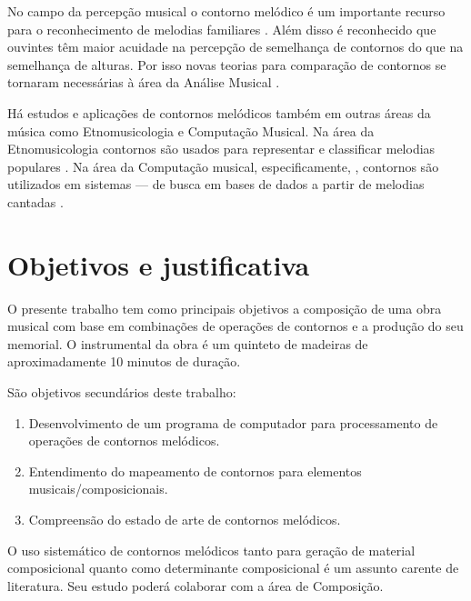 No campo da percepção musical o contorno melódico é um importante
recurso para o reconhecimento de melodias familiares \cite[p.
136]{dowling.ea86:music}. Além disso é reconhecido que ouvintes têm
maior acuidade na percepção de semelhança de contornos do que na
semelhança de alturas.
Por isso novas teorias para comparação de contornos se tornaram
necessárias à área da Análise Musical
\cite[p. 226]{marvin.ea87:relating}.

Há estudos e aplicações de contornos melódicos também em outras áreas
da música como Etnomusicologia e Computação Musical. Na área da
Etnomusicologia contornos são usados para representar e classificar
melodias populares \cite{adams76:melodic}. Na área da Computação
musical, especificamente, , contornos
são utilizados em sistemas  --- de busca em
bases de dados a partir de melodias cantadas \cite{ghias.ea95:query}.

\section{Objetivos e justificativa}
\label{sec:objet-e-just}

O presente trabalho tem como principais objetivos a composição de uma
obra musical com base em combinações de operações de contornos e a
produção do seu memorial. O instrumental da obra é um quinteto de
madeiras de aproximadamente 10 minutos de duração.

São objetivos secundários deste trabalho:

\begin{enumerate}
\item Desenvolvimento de um programa de computador para processamento
  de operações de contornos melódicos.
\item Entendimento do mapeamento de contornos para elementos
  musicais/composicionais.
\item Compreensão do estado de arte de contornos melódicos.
\end{enumerate}

O uso sistemático de contornos melódicos tanto para geração de
material composicional quanto como determinante composicional é um
assunto carente de literatura.
Seu estudo poderá colaborar com a área de Composição.

